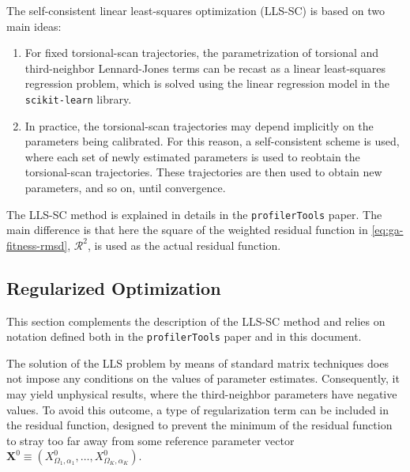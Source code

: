 \documentclass[10pt,a4paper,openany]{memoir}
\numberwithin{equation}{section}
\newcommand{\profilertools}[0]{\texttt{profilerTools}}
\begin{document}
The self-consistent linear least-squares optimization (LLS-SC) is
based on two main ideas:

\begin{enumerate}
  \item For fixed torsional-scan trajectories, the parametrization of
    torsional and third-neighbor Lennard-Jones terms can be recast as
    a linear least-squares regression problem, which is solved using
    the linear regression model in the \texttt{scikit-learn} library.
  \item In practice, the torsional-scan trajectories may depend
    implicitly on the parameters being calibrated. For this reason, a
    self-consistent scheme is used, where each set of newly estimated
    parameters is used to reobtain the torsional-scan trajectories.
    These trajectories are then used to obtain new parameters, and so
    on, until convergence.
\end{enumerate}

The LLS-SC method is explained in details in the \profilertools{}
paper\cite{PAPER}. The main difference is that here the square of
the weighted residual function in \autoref{eq:ga-fitness-rmsd},
$\mathcal{R}^{2}$, is used as the actual residual function.


\subsection{Regularized Optimization}
\label{sec:regularization}

This section complements the description of the LLS-SC method and
relies on notation defined both in the \profilertools{}
paper\cite{PAPER} and in this document.

The solution of the LLS problem by means of standard matrix techniques
does not impose any conditions on the values of parameter estimates.
%
Consequently, it may yield unphysical results, where the
third-neighbor parameters have negative values.
%
To avoid this outcome, a type of regularization term can be included
in the residual function, designed to prevent the minimum of the
residual function to stray too far away from some reference parameter
vector
$\mathbf{X}^0 \equiv (X^0_{\Omega_1,\alpha_1},\ldots,X^0_{\Omega_K,\alpha_K})$.
%
\end{document}
